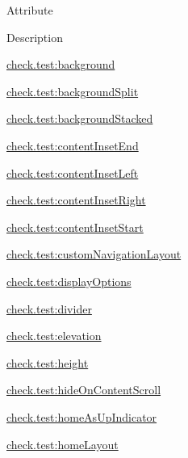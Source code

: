 Attribute

Description 

{\ttfamily \hyperlink{classcheck_1_1test_1_1_r_1_1styleable_a44f8d30ccaef9f5d0d40a81733978053}{check.\+test\+:background}}

{\ttfamily \hyperlink{classcheck_1_1test_1_1_r_1_1styleable_ab05dbfd1387a947374d7ec306fa7b7a1}{check.\+test\+:background\+Split}}

{\ttfamily \hyperlink{classcheck_1_1test_1_1_r_1_1styleable_a6cf5689cb912280e627b781eaa714029}{check.\+test\+:background\+Stacked}}

{\ttfamily \hyperlink{classcheck_1_1test_1_1_r_1_1styleable_a63267bbb6779348e53e468800d19e766}{check.\+test\+:content\+Inset\+End}}

{\ttfamily \hyperlink{classcheck_1_1test_1_1_r_1_1styleable_af343f343d01cff19f5d4f79c6b1365d8}{check.\+test\+:content\+Inset\+Left}}

{\ttfamily \hyperlink{classcheck_1_1test_1_1_r_1_1styleable_a2e6574bce599da88fada999852ecddff}{check.\+test\+:content\+Inset\+Right}}

{\ttfamily \hyperlink{classcheck_1_1test_1_1_r_1_1styleable_a4c5e7ea9ebcd8ec777039551daa8f3f5}{check.\+test\+:content\+Inset\+Start}}

{\ttfamily \hyperlink{classcheck_1_1test_1_1_r_1_1styleable_ae4307a4bd959bb1787eb44b851f56578}{check.\+test\+:custom\+Navigation\+Layout}}

{\ttfamily \hyperlink{classcheck_1_1test_1_1_r_1_1styleable_a24df28f3ee73a49d2b813abaabda3b5b}{check.\+test\+:display\+Options}}

{\ttfamily \hyperlink{classcheck_1_1test_1_1_r_1_1styleable_a0d32a23092ef9676e80af1baef491e9b}{check.\+test\+:divider}}

{\ttfamily \hyperlink{classcheck_1_1test_1_1_r_1_1styleable_a04317e16738cdda5538f180e12395b7c}{check.\+test\+:elevation}}

{\ttfamily \hyperlink{classcheck_1_1test_1_1_r_1_1styleable_a1ad8ab9094975d894200659bb15e67fd}{check.\+test\+:height}}

{\ttfamily \hyperlink{classcheck_1_1test_1_1_r_1_1styleable_a62a234e7f0069b54f7bc50a087a598a6}{check.\+test\+:hide\+On\+Content\+Scroll}}

{\ttfamily \hyperlink{classcheck_1_1test_1_1_r_1_1styleable_a84fd3d85c1d60971f8574c3b4809433a}{check.\+test\+:home\+As\+Up\+Indicator}}

{\ttfamily \hyperlink{classcheck_1_1test_1_1_r_1_1styleable_a2036cd83e6c7153acfac1a87f273dbe5}{check.\+test\+:home\+Layout}}

